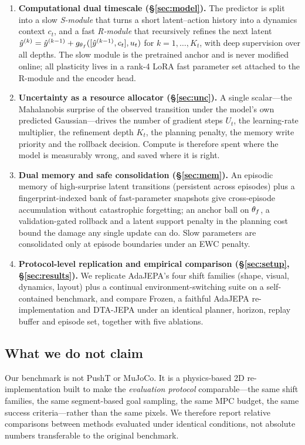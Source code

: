 \begin{enumerate}[leftmargin=1.2em,itemsep=2pt]
\item \textbf{Computational dual timescale (\S\ref{sec:model}).} The predictor is split into a
slow \emph{S-module} that turns a short latent--action history into a dynamics context $c_t$,
and a fast \emph{R-module} that recursively refines the next latent
$\hat{y}^{(k)} = \hat{y}^{(k-1)} + g_{\theta_f}([\hat{y}^{(k-1)},c_t],u_t)$ for $k=1,\dots,K_t$, with deep
supervision over all depths. The slow module is the pretrained anchor and is never modified
online; all plasticity lives in a rank-4 LoRA fast parameter set attached to the R-module and
the encoder head.
\item \textbf{Uncertainty as a resource allocator (\S\ref{sec:unc}).} A single scalar---the
Mahalanobis surprise of the observed transition under the model's own predicted
Gaussian---drives the number of gradient steps $U_t$, the learning-rate multiplier, the
refinement depth $K_t$, the planning penalty, the memory write priority and the rollback
decision. Compute is therefore spent where the model is measurably wrong, and saved where it
is right.
\item \textbf{Dual memory and safe consolidation (\S\ref{sec:mem}).} An episodic memory of
high-surprise latent transitions (persistent across episodes) plus a fingerprint-indexed bank
of fast-parameter snapshots give cross-episode accumulation without catastrophic forgetting;
an anchor ball on $\theta_f$, a validation-gated rollback and a latent support penalty in the
planning cost bound the damage any single update can do. Slow parameters are consolidated
only at episode boundaries under an EWC penalty.
\item \textbf{Protocol-level replication and empirical comparison (\S\ref{sec:setup},
\S\ref{sec:results}).} We replicate AdaJEPA's four shift families (shape, visual, dynamics,
layout) plus a continual environment-switching suite on a self-contained benchmark, and
compare Frozen, a faithful AdaJEPA re-implementation and DTA-JEPA under an identical planner,
horizon, replay buffer and episode set, together with five ablations.
\end{enumerate}

\subsection{What we do not claim}

Our benchmark is not PushT or MuJoCo. It is a physics-based 2D re-implementation built to make
the \emph{evaluation protocol} comparable---the same shift families, the same segment-based
goal sampling, the same MPC budget, the same success criteria---rather than the same pixels.
We therefore report relative comparisons between methods evaluated under identical conditions,
not absolute numbers transferable to the original benchmark.
